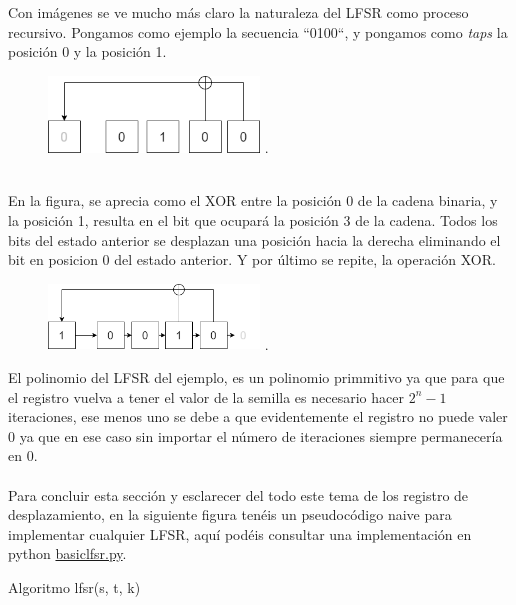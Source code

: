 Con imágenes se ve mucho más claro la naturaleza del LFSR como proceso recursivo. Pongamos como ejemplo la secuencia ``0100``, y pongamos como \textit{taps} la posición 0 y la posición 1. \\ 
\begin{figure}[h] 
    \centering
    \includegraphics[width=0.5\textwidth,keepaspectratio]{img/lfsr_01.png} .
    \label{fig:mi_imagen}
\end{figure}
\\
En la figura, se aprecia como el XOR entre la posición 0 de la cadena binaria, y la posición 1, resulta en el bit que ocupará la posición 3 de la cadena. Todos los bits del estado anterior se desplazan una posición hacia la derecha eliminando el bit en posicion 0 del estado anterior. Y por último se repite, la operación XOR.
\newpage
\begin{figure}[h] 
    \centering
    \includegraphics[width=0.5\textwidth,keepaspectratio]{img/lfsr02.png} .
    \label{fig:mi_imagen}
\end{figure}
\noindent El polinomio del LFSR del ejemplo, es un polinomio primmitivo ya que para que el registro vuelva a tener el valor de la semilla es necesario hacer $2^n-1$ iteraciones, ese menos uno se debe a que evidentemente el registro no puede valer 0 ya que en ese caso sin importar el número de iteraciones siempre permanecería en 0.\\\\
Para concluir esta sección y esclarecer del todo este tema de los registro de desplazamiento, en la siguiente figura tenéis un pseudocódigo naive para implementar cualquier LFSR, aquí podéis consultar una implementación en python \href{https://github.com/domingoUnican/TFGPedroCastro/blob/main/code/code_proofs/basic_lfsr.py}{basiclfsr.py}.\\ 
\begin{algorithm}
\caption{Algoritmo lfsr(s, t, k)}\label{alg:zero}
\end{algorithm}
